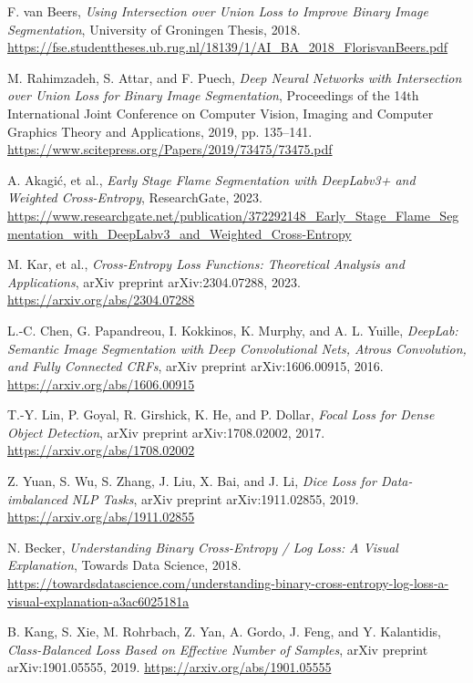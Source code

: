 \documentclass{article}
\begin{document}
\begin{thebibliography}{9}

F. van Beers, 
\textit{Using Intersection over Union Loss to Improve Binary Image Segmentation}, 
University of Groningen Thesis, 2018. 
\url{https://fse.studenttheses.ub.rug.nl/18139/1/AI_BA_2018_FlorisvanBeers.pdf}

M. Rahimzadeh, S. Attar, and F. Puech, 
\textit{Deep Neural Networks with Intersection over Union Loss for Binary Image Segmentation}, 
Proceedings of the 14th International Joint Conference on Computer Vision, Imaging and Computer Graphics Theory and Applications, 2019, pp. 135--141. 
\url{https://www.scitepress.org/Papers/2019/73475/73475.pdf}

A. Akagić, et al., 
\textit{Early Stage Flame Segmentation with DeepLabv3+ and Weighted Cross-Entropy}, 
ResearchGate, 2023. 
\url{https://www.researchgate.net/publication/372292148_Early_Stage_Flame_Segmentation_with_DeepLabv3_and_Weighted_Cross-Entropy}

M. Kar, et al., 
\textit{Cross-Entropy Loss Functions: Theoretical Analysis and Applications}, 
arXiv preprint arXiv:2304.07288, 2023. 
\url{https://arxiv.org/abs/2304.07288}

L.-C. Chen, G. Papandreou, I. Kokkinos, K. Murphy, and A. L. Yuille, 
\textit{DeepLab: Semantic Image Segmentation with Deep Convolutional Nets, Atrous Convolution, and Fully Connected CRFs}, 
arXiv preprint arXiv:1606.00915, 2016. 
\url{https://arxiv.org/abs/1606.00915}

T.-Y. Lin, P. Goyal, R. Girshick, K. He, and P. Dollar, 
\textit{Focal Loss for Dense Object Detection}, 
arXiv preprint arXiv:1708.02002, 2017. 
\url{https://arxiv.org/abs/1708.02002}

Z. Yuan, S. Wu, S. Zhang, J. Liu, X. Bai, and J. Li, 
\textit{Dice Loss for Data-imbalanced NLP Tasks}, 
arXiv preprint arXiv:1911.02855, 2019. 
\url{https://arxiv.org/abs/1911.02855}

N. Becker, 
\textit{Understanding Binary Cross-Entropy / Log Loss: A Visual Explanation}, 
Towards Data Science, 2018. 
\url{https://towardsdatascience.com/understanding-binary-cross-entropy-log-loss-a-visual-explanation-a3ac6025181a}

B. Kang, S. Xie, M. Rohrbach, Z. Yan, A. Gordo, J. Feng, and Y. Kalantidis, 
\textit{Class-Balanced Loss Based on Effective Number of Samples}, 
arXiv preprint arXiv:1901.05555, 2019. 
\url{https://arxiv.org/abs/1901.05555}


\end{thebibliography}
\end{document}
